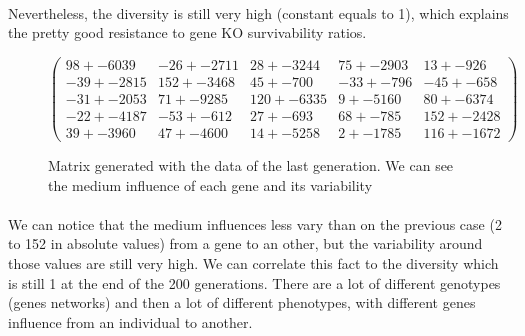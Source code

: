 \documentclass[]{report} %
\begin{document}
    \paragraph*{}
    Nevertheless, the diversity is still very high (constant equals to 1), which explains the pretty good resistance to gene KO survivability ratios.
   

    \begin{figure}[H] 
            \centering
            \small
    $
            \begin{pmatrix}
                98 +- 6039 & -26 +- 2711 & 28 +- 3244 & 75 +- 2903 & 13 +- 926 \\
                -39 +- 2815 & 152 +- 3468 & 45 +- 700 & -33 +- 796 & -45 +- 658 \\
                -31 +- 2053 & 71 +- 9285 & 120 +- 6335 & 9 +- 5160 & 80 +- 6374 \\
                -22 +- 4187 & -53 +- 612 & 27 +- 693 & 68 +- 785 & 152 +- 2428 \\
                39 +- 3960 & 47 +- 4600 & 14 +- 5258 & 2 +- 1785 & 116 +- 1672 
            \end{pmatrix}
    $
            \caption{\footnotesize Matrix generated with the data of the last generation. We can see the medium influence of each gene and its variability}
            \label{mat:ps300xg200xmr1-10-1}
    \end{figure}
    \paragraph*{}
     We can notice that the medium influences less vary than on the previous case (2 to 152 in absolute values) from a gene to an other, but the variability around those values are still very high. We can correlate this fact to the diversity which is still 1 at the end of the 200 generations. There are a lot of different genotypes (genes networks) and then a lot of different phenotypes, with different genes influence from an individual to another.
    
    
\end{document}
